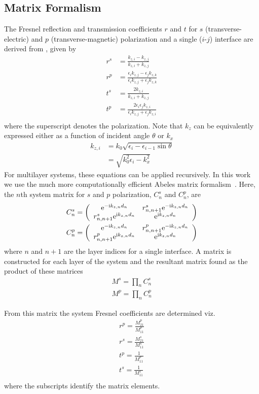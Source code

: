 \subsection{Matrix Formalism}
The Fresnel reflection and transmission coefficients $r$ and $t$ for $s$
(transverse-electric) and $p$ (transverse-magnetic) polarization and a
single ($i$-$j$) interface are derived from , given
by
\begin{align}
  r^s & = \frac{k_{z,i}-k_{z,j}}{k_{z,i}+k_{z,j}}                                                 \\
  r^p & = \frac{\epsilon_i k_{z,j} - \epsilon_j k_{z,k}}{\epsilon_i k_{z,j} + \epsilon_j k_{z,k}} \\
  t^s & = \frac{2 k_{z,i}}{k_{z,i}+k_{z,j}}                                                       \\
  t^p & = \frac{2 \epsilon_i \epsilon_j k_{z,i}}{\epsilon_i k_{z,j} + \epsilon_j k_{z,i}}         \\
\end{align}
where the superscript denotes the polarization.
Note that $k_{z}$ can be equivalently expressed either as a
function of incident angle $\theta$ or $k_x$
\begin{align}
  k_{z,i} & = k_0 \sqrt{\epsilon_i - \epsilon_{i-1} \sin \theta} \\
          & = \sqrt{k_0^2\epsilon_i - k_x^2}
\end{align}
For multilayer systems, these equations can be applied recursively. In
this work we use the much more computationally efficient
Abeles matrix formalism~\cite{abeles1948propagation}.  Here, the $n$th system matrix for $s$ and $p$
polarization, $C^s_n$ and $C^p_n$, are
\begin{align}
  C^s_n = \left(\begin{array}{cc}
      {\mathrm{e}}^{-{\mathrm{i}} k_{z,n} d_n}            & r^s_{n,n+1} {\mathrm{e}}^{-{\mathrm{i}} k_{z,n} d_n} \\
      r^s_{n,n+1} {\mathrm{e}}^{{\mathrm{i}} k_{z,n} d_n} & {\mathrm{e}}^{{\mathrm{i}} k_{z,n} d_n}
    \end{array}\right) \\
  C^p_n = \left(\begin{array}{cc}
      {\mathrm{e}}^{-{\mathrm{i}} k_{z,n} d_n}            & r^p_{n,n+1} {\mathrm{e}}^{-{\mathrm{i}} k_{z,n} d_n} \\
      r^p_{n,n+1} {\mathrm{e}}^{{\mathrm{i}} k_{z,n} d_n} & {\mathrm{e}}^{{\mathrm{i}} k_{z,n} d_n}
    \end{array}\right)
\end{align}
where $n$ and $n+1$ are the layer indices for a single interface.  A
matrix is constructed for each layer of the system and the resultant matrix
found as the product of these matrices
\begin{align}
  M^s=\prod_n C^s_n \\
  M^p=\prod_n C^p_n
\end{align}

From this matrix the system Fresnel coefficients are determined viz.
\begin{align}
  r^p = \frac{M^p_{21}}{M^p_{11}} \\
  r^s = \frac{M^s_{21}}{M^s_{11}} \\
  t^p = \frac{1}{M^p_{11}}        \\
  t^s = \frac{1}{M^s_{11}}        \\
\end{align}
where the subscripts identify the matrix elements.


